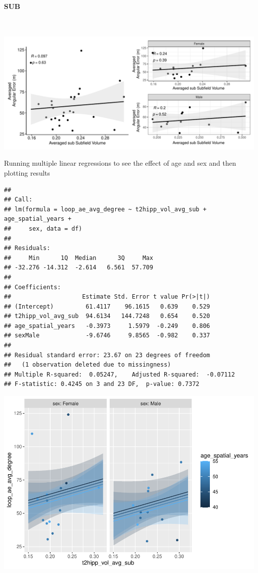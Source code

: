 \documentclass[
]{article}
\begin{document}
\paragraph{SUB}

~ \vspace{1cm}

\includegraphics{hippocampal_subfield_files/figure-latex/unnamed-chunk-7-1.pdf}

\vspace{1cm}

Running multiple linear regressions to see the effect of age and sex and
then plotting results

\begin{verbatim}
## 
## Call:
## lm(formula = loop_ae_avg_degree ~ t2hipp_vol_avg_sub + age_spatial_years + 
##     sex, data = df)
## 
## Residuals:
##     Min      1Q  Median      3Q     Max 
## -32.276 -14.312  -2.614   6.561  57.709 
## 
## Coefficients:
##                    Estimate Std. Error t value Pr(>|t|)
## (Intercept)         61.4117    96.1615   0.639    0.529
## t2hipp_vol_avg_sub  94.6134   144.7248   0.654    0.520
## age_spatial_years   -0.3973     1.5979  -0.249    0.806
## sexMale             -9.6746     9.8565  -0.982    0.337
## 
## Residual standard error: 23.67 on 23 degrees of freedom
##   (1 observation deleted due to missingness)
## Multiple R-squared:  0.05247,    Adjusted R-squared:  -0.07112 
## F-statistic: 0.4245 on 3 and 23 DF,  p-value: 0.7372
\end{verbatim}

\includegraphics{hippocampal_subfield_files/figure-latex/Avg SUB + avg angular error MLR-1.pdf}
\vspace{1cm}
\end{document}

